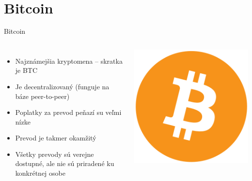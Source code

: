 \documentclass{beamer}
\begin{document}
\section{Bitcoin}
\begin{frame}{Bitcoin}
    \begin{columns}
    \begin{itemize}
        \item Najznámejšia kryptomena -- skratka je BTC
        \item Je decentralizovaný (funguje na báze peer-to-peer)
        \item Poplatky za prevod peňazí su veľmi nízke
        \item Prevod je takmer okamžitý
        \item Všetky prevody sú verejne dostupné, ale nie sú priradené ku konkrétnej osobe
    \end{itemize}
        \includegraphics[scale=2]{bitcoin.png}
    \end{columns}
\end{frame}
\end{document}
